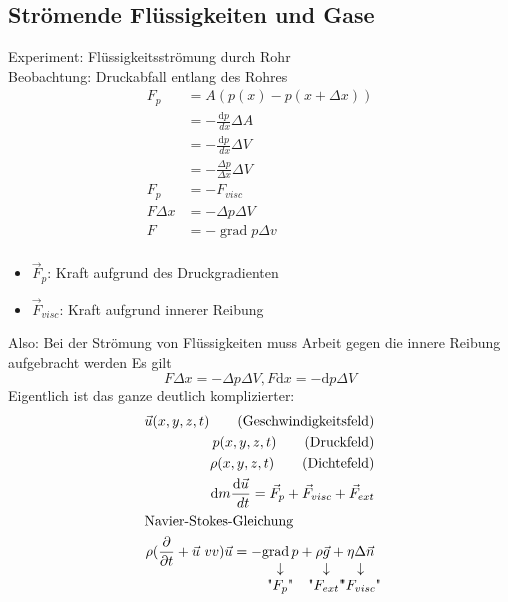 \documentclass[a4paper]{scrartcl}
\DeclareMathOperator{\grad}{grad}
\renewcommand{\d}{\mathrm{d}}
\renewcommand{\v}[1]{\vec{#1}}
\newcommand{\dd}[2]{\frac{\d #1}{\ d#2}}
\theoremstyle{definition}
\theoremstyle{plain}
\theoremstyle{plain}
\theoremstyle{remark}
\theoremstyle{remark}
\theoremstyle{remark}
\begin{document}
\subsection{Strömende Flüssigkeiten und Gase}
\label{sec-9-6}
Experiment: Flüssigkeitsströmung durch Rohr \\
   Beobachtung: Druckabfall entlang des Rohres \\
\begin{align*}
F_p &= A(p(x) - p(x + \Delta x)) \\
&=  -\dd{p}{x} \Delta A \\
&= -\dd{p}{x}\Delta V \\
&= -\frac{\Delta p}{\Delta x}\Delta V \\
F_p &= -F_{visc} \\
F\Delta x &= -\Delta p \Delta V \\
F &= -\grad p \Delta v \\
\end{align*}
\begin{itemize}
\item $\v F_p$: Kraft aufgrund des Druckgradienten
\item $\v F_{visc}$: Kraft aufgrund innerer Reibung
\end{itemize}
Also: Bei der Strömung von Flüssigkeiten muss Arbeit gegen die innere Reibung aufgebracht werden
Es gilt
\[F\Delta x = -\Delta p \Delta V, F\d x = -\d p \Delta V\]
Eigentlich ist das ganze deutlich komplizierter:
\begin{align*}
\v u (x,y,z,t) \tag{Geschwindigkeitsfeld} \\
p(x,y,z,t) \tag{Druckfeld} \\
\rho(x,y,z,t) \tag{Dichtefeld} \\
\d m \dd{\v u}{t} = \v F_p + \v F_{visc} + \v F_{ext} \\
\intertext{Navier-Stokes-Gleichung}
\rho(\frac{\partial}{\partial t} + \v u \ v v) \v u = -\underarrow[\grad p]{"$F_p$"} + \rho \underarrow[\v g]{"$F_{ext}$"} + \underarrow[\eta \Delta \v n]{"$F_{visc}$"} \\
\end{align*}
\end{document}
